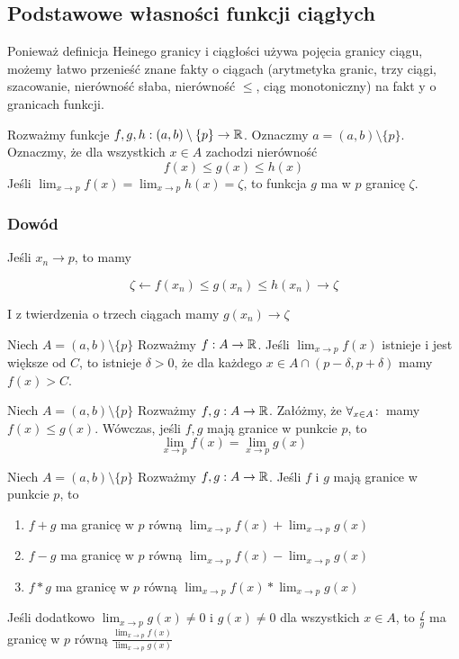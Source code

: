 \documentclass[9pt]{article}
\begin{document}
\subsection{Podstawowe własności funkcji ciągłych}

Ponieważ definicja Heinego granicy i ciągłości używa pojęcia granicy ciągu, możemy łatwo przenieść
znane fakty o ciągach (arytmetyka granic, trzy ciągi, szacowanie, nierówność słaba, nierówność
$\le$, ciąg monotoniczny) na fakt y o granicach funkcji.

\begin{Twi}
    Rozważmy funkcje $f, g, h: (a,b) \setminus \{p\} \to \mathbb{R}$. Oznaczmy $a = (a,b) \setminus \{p\}$.
    Oznaczmy, że dla wszystkich $x \in A$ zachodzi nierówność
    \[
        f(x) \le g(x) \le h(x)
    \]
    Jeśli $\lim_{x \to p} f(x) = \lim_{x \to p} h(x) = \zeta$, to funkcja $g$ ma w $p$ granicę
    $\zeta$.
\end{Twi}

\subsubsection*{Dowód}

Jeśli $x_n \to p$, to mamy

\[
    \zeta \leftarrow f(x_n) \le g(x_n) \le h(x_n) \to \zeta
\]

I z twierdzenia o trzech ciągach mamy $g(x_n) \to \zeta$

\begin{Twi}[o szacowaniu]
    Niech $A = (a,b) \setminus \{p\}$ Rozważmy $f: A \to \mathbb{R}$. Jeśli $\lim_{x \to p} f(x)$ istnieje i
    jest większe od $C$, to istnieje $\delta > 0$, że dla każdego $x \in A \cap (p-\delta,
    p+\delta)$ mamy $f(x) > C$.
\end{Twi}

\begin{Twi}
    Niech $A = (a,b) \setminus \{p\}$ Rozważmy $f, g: A \to \mathbb{R}$. Załóżmy, że $\forall_{x \in A} \! : \,$ mamy
    $f(x) \le g(x)$. Wówczas, jeśli $f, g$ mają granice w punkcie $p$, to
    \[
        \lim_{x \to p} f(x) = 
        \lim_{x \to p} g(x)
    \]
\end{Twi}

\begin{Twi}
    Niech $A = (a,b) \setminus \{p\}$ Rozważmy $f, g: A \to \mathbb{R}$. Jeśli $f$ i $g$ mają granice w
    punkcie $p$, to
    \begin{enumerate}
        \item
            $f+g$ ma granicę w $p$ równą $\lim_{x \to p} f(x) + \lim_{x \to p} g(x)$
        \item
            $f-g$ ma granicę w $p$ równą $\lim_{x \to p} f(x) - \lim_{x \to p} g(x)$
        \item
            $f*g$ ma granicę w $p$ równą $\lim_{x \to p} f(x) * \lim_{x \to p} g(x)$
    \end{enumerate}
    Jeśli dodatkowo $\lim_{x \to p} g(x) \ne 0$ i $g(x) \ne 0$ dla wszystkich $x \in A$, to
            $\frac{f}{g}$ ma granicę w $p$ równą $\frac{\lim_{x \to p} f(x)}{\lim_{x \to p} g(x)}$
\end{Twi}
\end{document}
